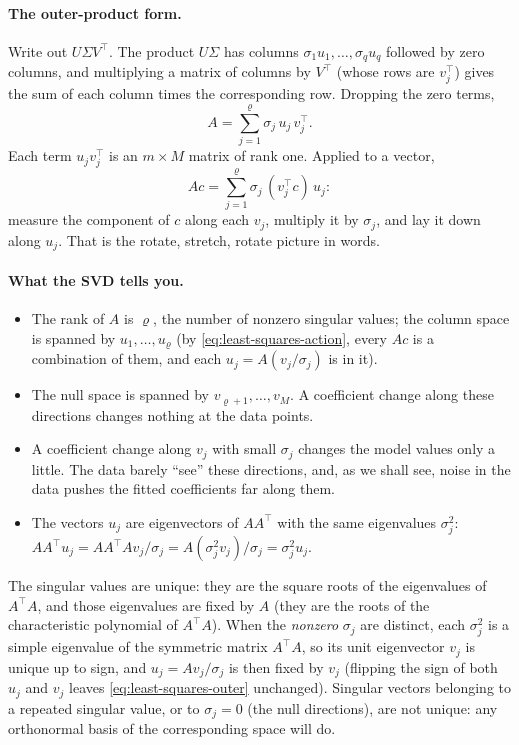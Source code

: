 \paragraph{The outer-product form.} Write out $U\Sigma V^\top$. The product $U\Sigma$ has columns $\sigma_1u_1,\dots,\sigma_q u_q$ followed by zero columns, and multiplying a matrix of columns by $V^\top$ (whose rows are $v_j^\top$) gives the sum of each column times the corresponding row. Dropping the zero terms,
\begin{equation}
A = \sum_{j=1}^{\varrho} \sigma_j\, u_j\, v_j^\top .
\label{eq:least-squares-outer}
\end{equation}
Each term $u_jv_j^\top$ is an $m\times M$ matrix of rank one. Applied to a vector,
\begin{equation}
Ac = \sum_{j=1}^\varrho \sigma_j\,(v_j^\top c)\,u_j :
\label{eq:least-squares-action}
\end{equation}
measure the component of $c$ along each $v_j$, multiply it by $\sigma_j$, and lay it down along $u_j$. That is the rotate, stretch, rotate picture in words.

\paragraph{What the SVD tells you.}
\begin{itemize}
\item The rank of $A$ is $\varrho$, the number of nonzero singular values; the column space is spanned by $u_1,\dots,u_\varrho$ (by \cref{eq:least-squares-action}, every $Ac$ is a combination of them, and each $u_j = A(v_j/\sigma_j)$ is in it).
\item The null space is spanned by $v_{\varrho+1},\dots,v_M$. A coefficient change along these directions changes nothing at the data points.
\item A coefficient change along $v_j$ with small $\sigma_j$ changes the model values only a little. The data barely ``see'' these directions, and, as we shall see, noise in the data pushes the fitted coefficients far along them.
\item The vectors $u_j$ are eigenvectors of $AA^\top$ with the same eigenvalues $\sigma_j^2$: $AA^\top u_j = AA^\top A v_j/\sigma_j = A(\sigma_j^2 v_j)/\sigma_j = \sigma_j^2 u_j$.
\end{itemize}
The singular values are unique: they are the square roots of the eigenvalues of $A^\top A$, and those eigenvalues are fixed by $A$ (they are the roots of the characteristic polynomial of $A^\top A$). When the \emph{nonzero} $\sigma_j$ are distinct, each $\sigma_j^2$ is a simple eigenvalue of the symmetric matrix $A^\top A$, so its unit eigenvector $v_j$ is unique up to sign, and $u_j = Av_j/\sigma_j$ is then fixed by $v_j$ (flipping the sign of both $u_j$ and $v_j$ leaves \cref{eq:least-squares-outer} unchanged). Singular vectors belonging to a repeated singular value, or to $\sigma_j = 0$ (the null directions), are not unique: any orthonormal basis of the corresponding space will do.

